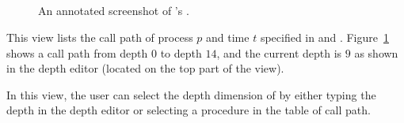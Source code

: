 \subsection{\callview}
\label{sec:callview}

\begin{figure}[t]
\caption{An annotated screenshot of \hpctraceviewer{}'s \callview.}
\label{fig:hpctraceviewer-callpath-legend}
\end{figure}

This view lists the call path of process $p$ and time $t$ specified in \traceview{} and \depthview.
Figure~\ref{fig:hpctraceviewer-callpath-legend} shows a call path from depth $0$ to depth $14$, and the current depth is $9$ as shown in the depth editor (located on the top part of the view).

In this view, the user can select the depth dimension of \traceview{} by either typing the depth in the depth editor or selecting a procedure in the table of call path.

